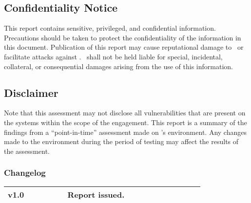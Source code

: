 \thispagestyle{empty} %

\begin{twothirdswidth} %
	\footnotesize %
	
	\subsection*{Confidentiality Notice}

	This report contains sensitive, privileged, and confidential information. Precautions should be taken to protect the confidentiality of the information in this document. Publication of this report may cause reputational damage to \clientFullName\ or facilitate attacks against \clientFullName. \teamName\ shall not be held liable for special, incidental, collateral, or consequential damages arising from the use of this information. 
	
	\subsection*{Disclaimer}
	
    Note that this assessment may not disclose all vulnerabilities that are present on the systems within the scope of the engagement. This report is a summary of the findings from a “point-in-time” assessment made on \clientFullName's environment. Any changes made to the environment during the period of testing may affect the results of the assessment. 
	
	\vfill %
	
	\subsubsection*{Changelog}
	
	\scriptsize %
	
	\begin{tabular}{@{} L{0.05\linewidth} L{0.15\linewidth} L{0.6\linewidth} @{}} %
		\toprule
		v1.0 & \reportDate\ & Report issued.\\
		\bottomrule
	\end{tabular}
\end{twothirdswidth}

\newpage